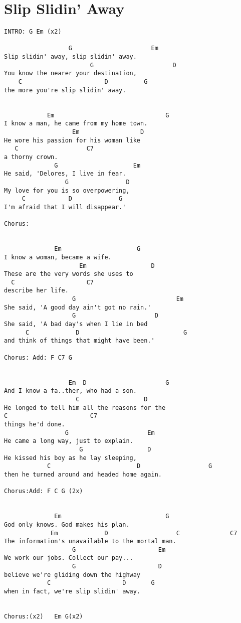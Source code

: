 \documentclass[leqno]{memoir}
\begin{document}
\chapter{Slip Slidin' Away}
\begin{verbatim}
INTRO: G Em (x2)   
  
                  G                      Em   
Slip slidin' away, slip slidin' away.   
                        G                      D   
You know the nearer your destination,   
    C                       D          G   
the more you're slip slidin' away.   

  
            Em                               G   
I know a man, he came from my home town.   
                   Em                 D   
He wore his passion for his woman like    
   C                   C7  
a thorny crown.   
              G                     Em   
He said, 'Delores, I live in fear.   
                 G                D   
My love for you is so overpowering,   
     C            D             G   
I'm afraid that I will disappear.'   

Chorus:   

  
              Em                     G   
I know a woman, became a wife.   
                     Em                  D            
These are the very words she uses to   
  C                    C7  
describe her life.   
                   G                            Em   
She said, 'A good day ain't got no rain.'   
                   G                      D   
She said, 'A bad day's when I lie in bed    
      C             D                             G   
and think of things that might have been.'   

Chorus: Add: F C7 G   

  
                  Em  D                      G   
And I know a fa..ther, who had a son.   
                    C                  D   
He longed to tell him all the reasons for the   
C                       C7  
things he'd done.   
                 G                      Em   
He came a long way, just to explain.   
                     G                  D   
He kissed his boy as he lay sleeping,   
            C                        D                   G   
then he turned around and headed home again.   

Chorus:Add: F C G (2x)  

  
              Em                             G   
God only knows. God makes his plan.   
             Em             D                   C              C7  
The information's unavailable to the mortal man.   
                   G                       Em   
We work our jobs. Collect our pay...   
                   G                       D   
believe we're gliding down the highway   
            C                    D       G   
when in fact, we're slip slidin' away.   


Chorus:(x2)   Em G(x2)   

\end{verbatim}
\end{document}
